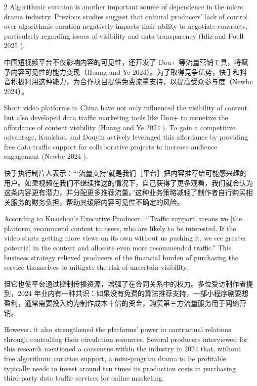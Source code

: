 \documentclass[10pt,a4paper]{article}
\begin{document}
\begin{paracol}{2}
\switchcolumn
Algorithmic curation is another important source of dependence in the micro drama industry. Previous studies suggest that cultural producers’ lack of control over algorithmic curation negatively impacts their ability to negotiate contracts, particularly regarding issues of visibility and data transparency (Idiz and Poell 2025 ).\par
\switchcolumn*
中国短视频平台不仅影响内容的可见性，还开发了 Dou+ 等流量营销工具，将赋予内容可见性的能力变现（Huang and Ye 2024）。为了取得竞争优势，快手和抖音积极利用这种能力，为合作项目提供免费流量支持，以提高受众参与度（Newbc 2024）。\par
\switchcolumn
Short video platforms in China have not only influenced the visibility of content but also developed data traffic marketing tools like Dou+ to monetize the affordance of content visibility (Huang and Ye 2024 ). To gain a competitive advantage, Kuaishou and Douyin actively leveraged this affordance by providing free data traffic support for collaborative projects to increase audience engagement (Newbc 2024 ).\par
\switchcolumn*
快手执行制片人表示：“‘流量支持’就是我们［平台］把内容推荐给可能感兴趣的用户。如果视频在我们不继续推送的情况下，自己获得了更多观看，我们就会认为这条内容更有潜力，并分配更多推荐流量。”这种业务策略减轻了制作者自行购买相关服务的财务负担，帮助其缓解内容可见性不确定的风险。\par
\switchcolumn
According to Kuaishou’s Executive Producer, “‘Traffic support’ means we [the platform] recommend content to users, who are likely to be interested. If the video starts getting more views on its own without us pushing it, we see greater potential in the content and allocate even more recommended traffic.” This business strategy relieved producers of the financial burden of purchasing the service themselves to mitigate the risk of uncertain visibility.\par
\switchcolumn*
但它也使平台通过控制传播资源，增强了在合同关系中的权力。多位受访制作者提到，2024 年业内有一种共识：如果没有免费的算法推荐支持，一部小程序剧要想盈利，通常需要投入约为制作成本十倍的资金，购买第三方流量服务用于网络营销。\par
\switchcolumn
However, it also strengthened the platforms’ power in contractual relations through controlling their circulation resources. Several producers interviewed for this research mentioned a consensus within the industry in 2024 that, without free algorithmic curation support, a mini-program drama to be profitable typically needs to invest around ten times its production costs in purchasing third-party data traffic services for online marketing.\par

\end{paracol}
\end{document}
